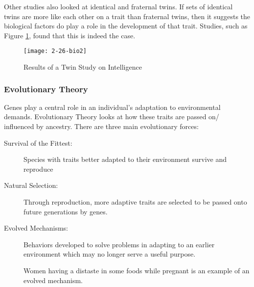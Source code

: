 \documentclass[../main/main.tex]{subfiles}
\begin{document}
Other studies also looked at identical and fraternal twins. If sets of identical twins are more like each other on a trait than fraternal twins, then it suggests the biological factors do play a role in the development of that trait. Studies, such as Figure \ref{2-26-bio2}, found that this is indeed the case.

\begin{figure}[htpb]
  \centering
  \texttt{[image: 2-26-bio2]}
  \caption{Results of a Twin Study on Intelligence}
  \label{2-26-bio2}
\end{figure}

\subsubsection{Evolutionary Theory}
Genes play a central role in an individual's adaptation to environmental demands. Evolutionary Theory looks at how these traits are passed on/ influenced by ancestry. There are three main evolutionary forces:
\begin{description}
  \item[Survival of the Fittest:] Species with traits better adapted to their environment survive and reproduce
    \item[Natural Selection:] Through reproduction, more adaptive traits are selected to be passed onto future generations by genes.
    \item[Evolved Mechanisms:] Behaviors developed to solve problems in adapting to an earlier environment which may no longer serve a useful purpose.
        \begin{remark}
Women having a distaste in some foods while pregnant is an example of an evolved mechanism.
        \end{remark}
\end{description}
\end{document}
